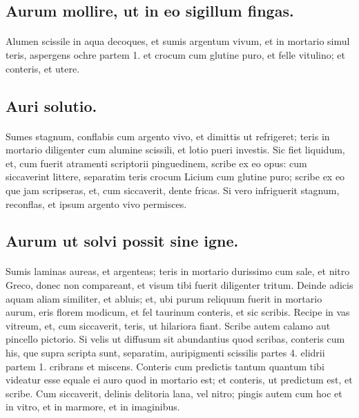 \documentclass[a4paper, 11pt, oneside, polutonikogreek, italian]{article}
\begin{document}
\subsection{Aurum mollire, ut in eo sigillum fingas.}
\paragraph{}
Alumen scissile in aqua decoques, et sumis argentum vivum, et in mortario simul teris, aspergens ochre partem 1. et crocum cum glutine puro, et felle vitulino; et conteris, et utere.

\subsection{Auri solutio.}
\paragraph{}
Sumes stagnum, conflabis cum argento vivo, et dimittis ut refrigeret; teris in mortario diligenter cum alumine scissili, et lotio pueri investis. Sic fiet liquidum, et, cum fuerit atramenti scriptorii pinguedinem, scribe ex eo opus: cum siccaverint littere, separatim teris crocum Licium cum glutine puro; scribe ex eo que jam scripseras, et, cum siccaverit, dente fricas. Si vero infriguerit stagnum, reconflas, et ipsum argento vivo permisces.

\subsection{Aurum ut solvi possit sine igne.}
\paragraph{}
Sumis laminas aureas, et argenteas; teris in mortario durissimo cum sale, et nitro Greco, donec non compareant, et visum tibi fuerit diligenter tritum. Deinde adicis aquam aliam similiter, et abluis; et, ubi purum reliquum fuerit in mortario aurum, eris florem modicum, et fel taurinum conteris, et sic scribis. Recipe in vas vitreum, et, cum siccaverit, teris, ut hilariora fiant. Scribe autem calamo aut pincello pictorio. Si velis ut diffusum sit abundantius quod scribas, conteris cum his, que supra scripta sunt, separatim, auripigmenti scissilis partes 4. elidrii partem 1. cribrans et miscens. Conteris cum predictis tantum quantum tibi videatur esse equale ei auro quod in mortario est; et conteris, ut predictum est, et scribe. Cum siccaverit, delinis delitoria lana, vel nitro; pingis autem cum hoc et in vitro, et in marmore, et in imaginibus.
\end{document}
